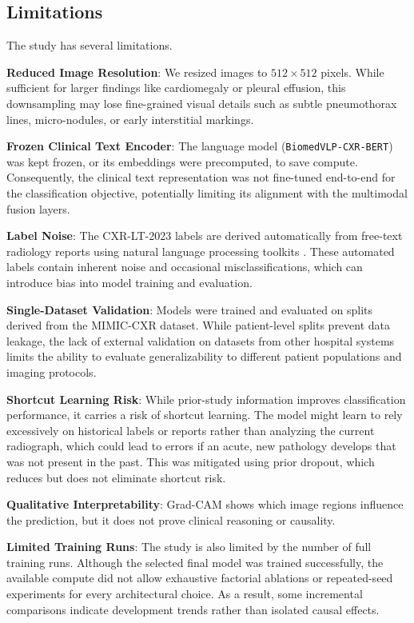 \subsection{Limitations}
\label{subsec:discussion_limitations}

The study has several limitations.

\textbf{Reduced Image Resolution}: We resized images to $512 \times 512$ pixels. While sufficient for larger findings like cardiomegaly or pleural effusion, this downsampling may lose fine-grained visual details such as subtle pneumothorax lines, micro-nodules, or early interstitial markings.

\textbf{Frozen Clinical Text Encoder}: The language model (\texttt{BiomedVLP-CXR-BERT}) was kept frozen, or its embeddings were precomputed, to save compute. Consequently, the clinical text representation was not fine-tuned end-to-end for the classification objective, potentially limiting its alignment with the multimodal fusion layers.

\textbf{Label Noise}: The CXR-LT-2023 labels are derived automatically from free-text radiology reports using natural language processing toolkits \cite{holste2024cxrlt}. These automated labels contain inherent noise and occasional misclassifications, which can introduce bias into model training and evaluation.

\textbf{Single-Dataset Validation}: Models were trained and evaluated on splits derived from the MIMIC-CXR dataset. While patient-level splits prevent data leakage, the lack of external validation on datasets from other hospital systems limits the ability to evaluate generalizability to different patient populations and imaging protocols.

\textbf{Shortcut Learning Risk}: While prior-study information improves classification performance, it carries a risk of shortcut learning. The model might learn to rely excessively on historical labels or reports rather than analyzing the current radiograph, which could lead to errors if an acute, new pathology develops that was not present in the past. This was mitigated using prior dropout, which reduces but does not eliminate shortcut risk.

\textbf{Qualitative Interpretability}: Grad-CAM \cite{selvaraju2017gradcam} shows which image regions influence the prediction, but it does not prove clinical reasoning or causality.

\textbf{Limited Training Runs}: The study is also limited by the number of full training runs. Although the selected final model was trained successfully, the available compute did not allow exhaustive factorial ablations or repeated-seed experiments for every architectural choice. As a result, some incremental comparisons indicate development trends rather than isolated causal effects.

